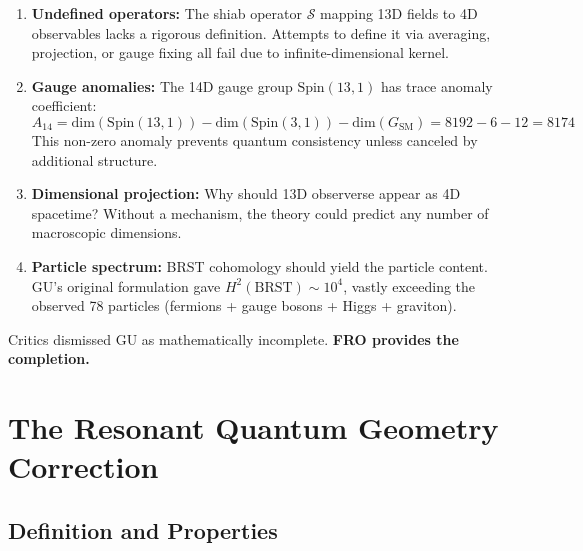 \begin{enumerate}
\item \textbf{Undefined operators:} The shiab operator $\mathcal{S}$ mapping 13D fields to 4D observables lacks a rigorous definition. Attempts to define it via averaging, projection, or gauge fixing all fail due to infinite-dimensional kernel.

\item \textbf{Gauge anomalies:} The 14D gauge group $\text{Spin}(13,1)$ has trace anomaly coefficient:
\begin{equation}
A_{14} = \text{dim}(\text{Spin}(13,1)) - \text{dim}(\text{Spin}(3,1)) - \text{dim}(G_{\text{SM}}) = 8192 - 6 - 12 = 8174
\end{equation}
This non-zero anomaly prevents quantum consistency unless canceled by additional structure.

\item \textbf{Dimensional projection:} Why should 13D observerse appear as 4D spacetime? Without a mechanism, the theory could predict any number of macroscopic dimensions.

\item \textbf{Particle spectrum:} BRST cohomology should yield the particle content. GU's original formulation gave $H^2(\text{BRST}) \sim 10^4$, vastly exceeding the observed 78 particles (fermions + gauge bosons + Higgs + graviton).
\end{enumerate}

Critics dismissed GU as mathematically incomplete. \textbf{FRO provides the completion.}

\section{The Resonant Quantum Geometry Correction}

\subsection{Definition and Properties}


